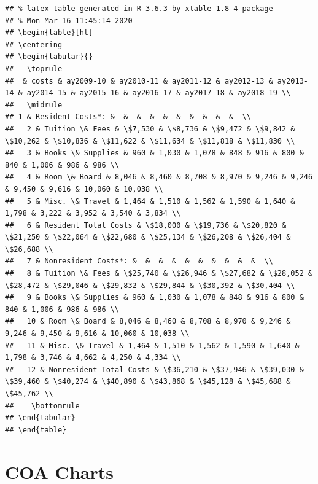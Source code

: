 \documentclass[
]{book}
\begin{document}
\begin{verbatim}
## % latex table generated in R 3.6.3 by xtable 1.8-4 package
## % Mon Mar 16 11:45:14 2020
## \begin{table}[ht]
## \centering
## \begin{tabular}{}
##   \toprule
##  & costs & ay2009-10 & ay2010-11 & ay2011-12 & ay2012-13 & ay2013-14 & ay2014-15 & ay2015-16 & ay2016-17 & ay2017-18 & ay2018-19 \\ 
##   \midrule
## 1 & Resident Costs*: &  &  &  &  &  &  &  &  &  &  \\ 
##   2 & Tuition \& Fees & \$7,530 & \$8,736 & \$9,472 & \$9,842 & \$10,262 & \$10,836 & \$11,622 & \$11,634 & \$11,818 & \$11,830 \\ 
##   3 & Books \& Supplies & 960 & 1,030 & 1,078 & 848 & 916 & 800 & 840 & 1,006 & 986 & 986 \\ 
##   4 & Room \& Board & 8,046 & 8,460 & 8,708 & 8,970 & 9,246 & 9,246 & 9,450 & 9,616 & 10,060 & 10,038 \\ 
##   5 & Misc. \& Travel & 1,464 & 1,510 & 1,562 & 1,590 & 1,640 & 1,798 & 3,222 & 3,952 & 3,540 & 3,834 \\ 
##   6 & Resident Total Costs & \$18,000 & \$19,736 & \$20,820 & \$21,250 & \$22,064 & \$22,680 & \$25,134 & \$26,208 & \$26,404 & \$26,688 \\ 
##   7 & Nonresident Costs*: &  &  &  &  &  &  &  &  &  &  \\ 
##   8 & Tuition \& Fees & \$25,740 & \$26,946 & \$27,682 & \$28,052 & \$28,472 & \$29,046 & \$29,832 & \$29,844 & \$30,392 & \$30,404 \\ 
##   9 & Books \& Supplies & 960 & 1,030 & 1,078 & 848 & 916 & 800 & 840 & 1,006 & 986 & 986 \\ 
##   10 & Room \& Board & 8,046 & 8,460 & 8,708 & 8,970 & 9,246 & 9,246 & 9,450 & 9,616 & 10,060 & 10,038 \\ 
##   11 & Misc. \& Travel & 1,464 & 1,510 & 1,562 & 1,590 & 1,640 & 1,798 & 3,746 & 4,662 & 4,250 & 4,334 \\ 
##   12 & Nonresident Total Costs & \$36,210 & \$37,946 & \$39,030 & \$39,460 & \$40,274 & \$40,890 & \$43,868 & \$45,128 & \$45,688 & \$45,762 \\ 
##    \bottomrule
## \end{tabular}
## \end{table}
\end{verbatim}

\hypertarget{coa-charts}{%
\section{COA Charts}\label{coa-charts}}
\end{document}
